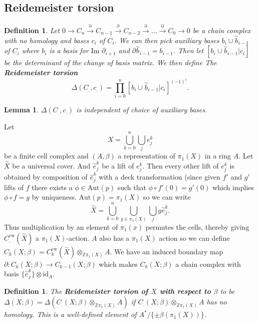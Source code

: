 \documentclass{article}
\newtheorem{definition}[theorem]{Definition}
\newtheorem{lemma}[theorem]{Lemma}
\begin{document}
\subsection{Reidemeister torsion}
\begin{definition}
Let $0\to C_n\overset{\partial}{\to}C_{n-1}\overset{\partial}{\to}C_{n-2}\overset{\partial}{\to}...\overset{\partial}{\to}C_{0}\to 0$ be a chain complex with no homology and bases $c_i$ of $C_i$. We can then pick auxiliary bases $b_i\cup\overset{\sim}{b}_{i-1}$ of $C_i$ where $b_i$ is a basis for $\text{Im }\partial_{i+1}$ and $\partial\overset{\sim}{b}_{i-1}=b_{i-1}$. Then let $[b_i\cup\overset{\sim}{b}_{i-1}|c_i]$ be the determinant of the change of basis matrix. We then define The \textbf{Reidemeister torsion} \[\Delta(C_.,c_.)=\prod_{i=0}^n[b_i\cup\overset{\sim}{b}_{i-1}|c_i]^{(-1)^i}.\]
\end{definition}

\begin{lemma}
$\Delta(C_.,c_.)$ is independent of choice of auxiliary bases.
\end{lemma}


\noindent Let \[X=\bigcup_{k=0}^n\bigcup_je_j^k\] be a finite cell complex and $(A,\beta)$ a representation of $\pi_1(X)$ in a ring $A$. Let $\overset{\sim}{X}$ be a universal cover. And $\overset{\sim}{e}_j^k$ be a lift of $e_j^k$. Then every other lift of $e_j^k$ is obtained by composition of $\overset{\sim}{e}_j^k$ with a deck transformation (since given $f'$ and $g'$ lifts of $f$ there exists a $\phi\in\text{Aut}(p)$ such that $\phi\circ f'(0)=g'(0)$ which implies $\phi\circ f=g$ by uniqueness. $\text{Aut}(p)=\pi_1(X)$ so we can write \[\overset{\sim}{X}=\bigcup_{k=0}^n\bigcup_{g\in\pi_1(X)}\bigcup_jg\overset{\sim}{e}_j^k.\] Thus multiplication by an element of $\pi_1(x)$ permutes the cells, thereby giving $C_.^\text{cw}(\overset{\sim}{X})$ a $\pi_1(X)$-action. $A$ also has a $\pi_1(X)$ action so we can define $C_k(X;\beta)=C_k^\text{cw}(\overset{\sim}{X})\otimes_{\mathbb{Z}\pi_1(X)} A$. We have an induced boundary map $\partial\colon C_k(X;\beta)\to C_{k-1}(X;\beta)$ which makes $C_k(X;\beta)$ a chain complex with basis $\{\overset{\sim}{e}_j^k\}\otimes\text{id}_A$.

\begin{definition}
The \textbf{Reidemeister torsion of $X$ with respect to $\beta$} to be $\Delta(X;\beta)=\Delta(C_.(X;\beta)\otimes_{\mathbb{Z}\pi_1(X)}A)$ if $C_.(X;\beta)\otimes_{\mathbb{Z}\pi_1(X)}A$ has no homology. This is a well-defined element of $A^*/\{\pm\beta(\pi_1(X))\}$.
\end{definition}
\end{document}
